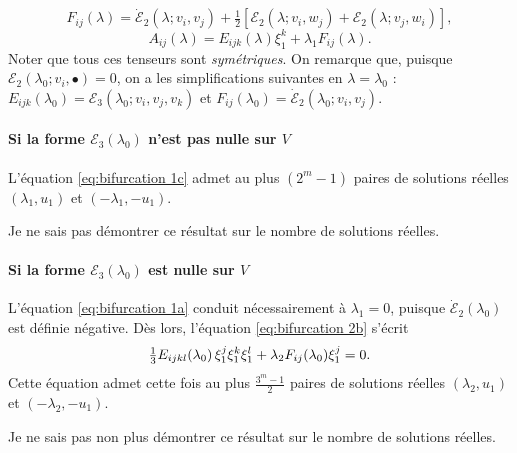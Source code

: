 \documentclass{article}
\newcommand{\tmem}[1]{{\em #1\/}}
\begin{document}
\begin{equation}
  \label{eq:def Fij} F_{i  j} (\lambda) = \dot{\mathcal{E}}_2 (\lambda
  ; v_i, v_j) + \tfrac{1}{2}  [\mathcal{E}_2 (\lambda  ; v_i, w_j)
  +\mathcal{E}_2 (\lambda  ; v_j, w_i)],
\end{equation}
\begin{equation}
  \label{eq:def Aij} A_{i  j} (\lambda) = E_{i  j  k}
  (\lambda) \xi_1^k + \lambda_1 F_{i  j} (\lambda) .
\end{equation}
Noter que tous ces tenseurs sont {\tmem{symétriques}}. On remarque que,
puisque $\mathcal{E}_2 (\lambda_0 ; v_i, \bullet) = 0$, on a les
simplifications suivantes en $\lambda = \lambda_0$ : $E_{i  j
k} (\lambda_0) =\mathcal{E}_3 (\lambda_0 ; v_i, v_j, v_k)$ et $F_{i
j} (\lambda_0) = \dot{\mathcal{E}}_2 (\lambda_0 ; v_i, v_j)$.

\paragraph{Si la forme $\mathcal{E}_3 (\lambda_0)$ n'est pas nulle sur
$V$}L'équation \eqref{eq:bifurcation 1c} admet au plus $(2^m - 1)$ paires
de solutions réelles $(\lambda_1, u_1)$ et $(- \lambda_1, - u_1)$.

\begin{remark}
  Je ne sais pas démontrer ce résultat sur le nombre de solutions
  réelles.
\end{remark}

\paragraph{Si la forme $\mathcal{E}_3 (\lambda_0)$ est nulle sur
$V$}L'équation \eqref{eq:bifurcation 1a} conduit nécessairement à
$\lambda_1 = 0$, puisque $\dot{\mathcal{E}}_2 (\lambda_0)$ est définie
négative. Dès lors, l'équation \eqref{eq:bifurcation 2b}
s'écrit
\begin{equation}
  \tfrac{1}{3} E_{i  j  k  l} (\lambda_0)
  \hspace{0.17em} \xi_1^j \xi_1^k \xi_1^l + \lambda_2 F_{i  j}
  (\lambda_0) \xi_1^j = 0.
\end{equation}
Cette équation admet cette fois au plus $\frac{3^m - 1}{2}$ paires de
solutions réelles $(\lambda_2, u_1)$ et $(- \lambda_2, - u_1)$.

\begin{remark}
  Je ne sais pas non plus démontrer ce résultat sur le nombre de
  solutions réelles.
\end{remark}
\end{document}
